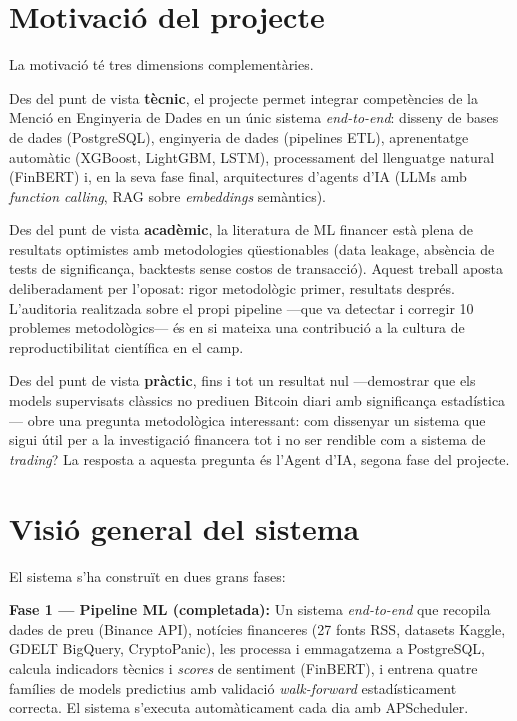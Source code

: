 \documentclass[12pt, a4paper]{report}
\begin{document}
\section{Motivació del projecte}

La motivació té tres dimensions complementàries.

Des del punt de vista \textbf{tècnic}, el projecte permet integrar competències de la Menció en Enginyeria de Dades en un únic sistema \textit{end-to-end}: disseny de bases de dades (PostgreSQL), enginyeria de dades (pipelines ETL), aprenentatge automàtic (XGBoost, LightGBM, LSTM), processament del llenguatge natural (FinBERT) i, en la seva fase final, arquitectures d'agents d'IA (LLMs amb \textit{function calling}, RAG sobre \textit{embeddings} semàntics).

Des del punt de vista \textbf{acadèmic}, la literatura de ML financer està plena de resultats optimistes amb metodologies qüestionables (data leakage, absència de tests de significança, backtests sense costos de transacció). Aquest treball aposta deliberadament per l'oposat: rigor metodològic primer, resultats després. L'auditoria realitzada sobre el propi pipeline ---que va detectar i corregir 10 problemes metodològics--- és en si mateixa una contribució a la cultura de reproductibilitat científica en el camp.

Des del punt de vista \textbf{pràctic}, fins i tot un resultat nul ---demostrar que els models supervisats clàssics no prediuen Bitcoin diari amb significança estadística--- obre una pregunta metodològica interessant: com dissenyar un sistema que sigui útil per a la investigació financera tot i no ser rendible com a sistema de \textit{trading}? La resposta a aquesta pregunta és l'Agent d'IA, segona fase del projecte.

\section{Visió general del sistema}

El sistema s'ha construït en dues grans fases:

\textbf{Fase 1 --- Pipeline ML (completada):} Un sistema \textit{end-to-end} que recopila dades de preu (Binance API), notícies financeres (27 fonts RSS, datasets Kaggle, GDELT BigQuery, CryptoPanic), les processa i emmagatzema a PostgreSQL, calcula indicadors tècnics i \textit{scores} de sentiment (FinBERT), i entrena quatre famílies de models predictius amb validació \textit{walk-forward} estadísticament correcta. El sistema s'executa automàticament cada dia amb APScheduler.
\end{document}
